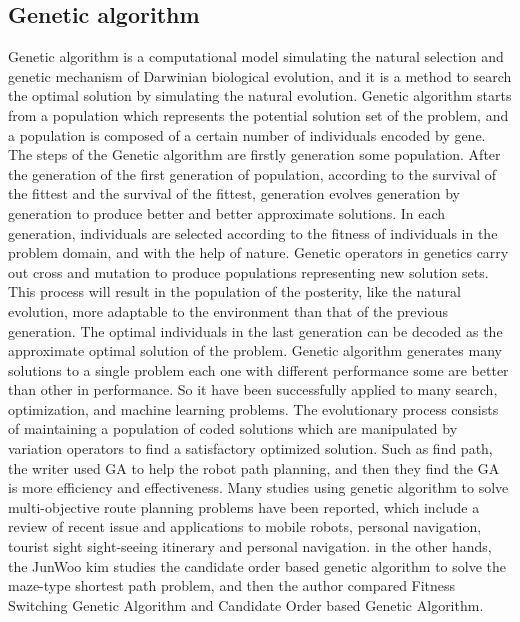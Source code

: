 \documentclass[12pt]{article}
\begin{document}
\subsection{Genetic algorithm}
Genetic algorithm is a computational model simulating the natural selection and genetic mechanism of Darwinian biological evolution, and it is a method to search the optimal solution by simulating the natural evolution. Genetic algorithm starts from a population which represents the potential solution set of the problem, and a population is composed of a certain number of individuals encoded by gene. The steps of the Genetic algorithm are firstly generation some population. After the generation of the first generation of population, according to the survival of the fittest and the survival of the fittest, generation evolves generation by generation to produce better and better approximate solutions. In each generation, individuals are selected according to the fitness of individuals in the problem domain, and with the help of nature. Genetic operators in genetics carry out cross and mutation to produce populations representing new solution sets. This process will result in the population of the posterity, like the natural evolution, more adaptable to the environment than that of the previous generation. The optimal individuals in the last generation can be decoded as the approximate optimal solution of the problem. Genetic algorithm generates many solutions to a single problem each one with different performance some are better than other in performance. So it have been successfully applied to many search, optimization, and machine learning problems. The evolutionary process consists of maintaining a population of coded solutions which are manipulated by variation operators to find a satisfactory optimized solution. Such as find path, the writer used GA to help the robot path planning\cite{Alnasser2016}, and then they find the GA is more efficiency and effectiveness. 
Many studies using genetic algorithm to solve multi-objective route planning problems have been reported, which include a review of recent issue and applications to mobile robots, personal navigation, tourist sight sight-seeing itinerary and personal navigation.    in the other hands, the JunWoo\cite{Kim2019} kim studies the candidate order based genetic algorithm to solve the maze-type shortest path problem, and then the author compared Fitness Switching Genetic Algorithm and Candidate Order based Genetic Algorithm. 
\end{document}
